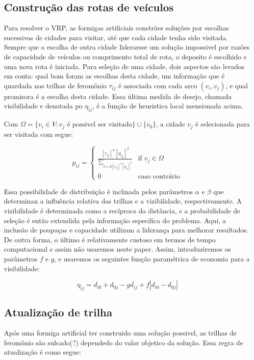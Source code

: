 \documentclass[a4paper, 12pt]{article}
\begin{document}
\subsection{Construção das rotas de veículos}

 Para resolver o VRP, as formigas artificiais constrões soluções por escolhas sucessivas de cidades
para visitar, até que cada cidade tenha sido visitada. Sempre que a escolha de outra cidade
liderarsse um solução impossivel por razões de capacidade de veículos ou comprimento total de rota,
o deposito é escolhido e uma nova rota é iniciada. Para seleção de uma cidade, dois aspectos são
levados em conta: qual bom foram as escolhas desta cidade, um informação que é quardada nas trilhas
de feromônio $\tau_{ij}$ é associada com cada arco $(v_i, v_j)$, e qual promisora é a escolha desta
cidade. Essa última medida de desejo, chamada visibilidade e denotada po $\eta_{ij}$, é a função de
heuristica local mensionada acima.

 Com $\Omega = \{ v_i \in V: v_j\textrm{ é possivel ser visitado} \} \cup \{v_0\}$, a cidade $v_j$ é
selecionada para ser visitada com segue:

\[p_{ij} = \left\{
\begin{array}{ll}
\frac{[\tau_{ij}]^\alpha[\eta_{ij}]^\beta}{\sum_{k\in\Omega[\tau_{ij}]^\alpha[\eta_{ij}]^\beta}}
& \textrm{if } v_j \in \Omega\\
0 & \textrm{caso contrário}
\end{array}\right.\]

 Essa possibilidade de distribuição é inclinada pelos parâmetros $\alpha$ e $\beta$ que determinan a
influência relativa das trilhas e a vizibilidade, respectivamente. A vizibilidade é determinada como
a recíproca da distância, e a probabilidade de seleção é então extendida pela informação específica
do problema. Aqui, a inclusão de poupaças e capacidade utilizam a liderança para melhorar
resultados. De outra forma, o último é relativamente custoso em termos de tempo computacional e
assim não usaremos neste paper. Assim, introduziremos os parâmetros $f$ e $g$, e usaremos os
seguintes função paramétrica de economia para a visibilidade:

 \[\eta_{ij} = d_{i0}+d_{0j}-gd_{ij}+f|d_{i0}-d_{0j}|\]

\subsection{Atualização de trilha}

 Após uma formiga artificial ter construido uma solução possivel, as trilhas de feromônio são
sulcado(?) dependedo do valor objetico da solução. Essa regra de atualização é como segue:
\end{document}
